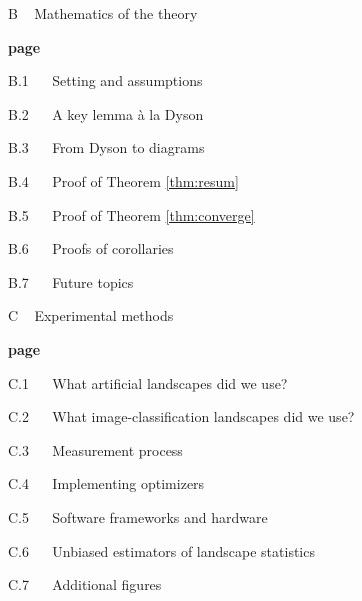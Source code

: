         {\bf
        \par\noindent B ~ Mathematics of the theory}                            \hfill {\bf page \pageref{appendix:math}}
        \par\indent     B.1 ~~ Setting and assumptions                          \hfill \pageref{appendix:assumptions}
        \par\indent     B.2 ~~ A key lemma \`a la Dyson                         \hfill \pageref{appendix:key-lemma}
        \par\indent     B.3 ~~ From Dyson to diagrams                           \hfill \pageref{appendix:toward-diagrams}
        \par\indent     B.4 ~~ Proof of Theorem \ref{thm:resum}                 \hfill \pageref{appendix:resum}
        \par\indent     B.5 ~~ Proof of Theorem \ref{thm:converge}              \hfill \pageref{appendix:converge}
        \par\indent     B.6 ~~ Proofs of corollaries                            \hfill \pageref{appendix:corollaries}
        \par\indent     B.7 ~~ Future topics                                    \hfill \pageref{appendix:future}
    
        {\bf
        \par\noindent C ~ Experimental methods}                                 \hfill {\bf page \pageref{appendix:experiments}}
        \par\indent     C.1 ~~ What artificial landscapes did we use?           \hfill \pageref{appendix:artificial}  
        \par\indent     C.2 ~~ What image-classification landscapes did we use? \hfill \pageref{appendix:natural}
        \par\indent     C.3 ~~ Measurement process                              \hfill \pageref{appendix:measure}
        \par\indent     C.4 ~~ Implementing optimizers                          \hfill \pageref{appendix:optimizers}
        \par\indent     C.5 ~~ Software frameworks and hardware                 \hfill \pageref{appendix:frameworks}
        \par\indent     C.6 ~~ Unbiased estimators of landscape statistics      \hfill \pageref{appendix:bessel}
        \par\indent     C.7 ~~ Additional figures                               \hfill \pageref{appendix:figures}

